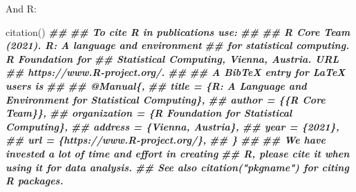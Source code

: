 \documentclass[
  ignorenonframetext,
  aspectratio=169,
]{beamer}
\newenvironment{Shaded}{\begin{snugshade}}{\end{snugshade}}
\newcommand{\DocumentationTok}[1]{\textcolor[rgb]{0.56,0.35,0.01}{\textbf{\textit{#1}}}}
\newcommand{\FunctionTok}[1]{\textcolor[rgb]{0.00,0.00,0.00}{#1}}
\newcommand{\NormalTok}[1]{#1}
\begin{document}
\begin{frame}[fragile]
And R:

\scriptsize

\begin{Shaded}
\begin{Highlighting}[]
\FunctionTok{citation}\NormalTok{()}
\DocumentationTok{\#\# }
\DocumentationTok{\#\# To cite R in publications use:}
\DocumentationTok{\#\# }
\DocumentationTok{\#\#   R Core Team (2021). R: A language and environment}
\DocumentationTok{\#\#   for statistical computing. R Foundation for}
\DocumentationTok{\#\#   Statistical Computing, Vienna, Austria. URL}
\DocumentationTok{\#\#   https://www.R{-}project.org/.}
\DocumentationTok{\#\# }
\DocumentationTok{\#\# A BibTeX entry for LaTeX users is}
\DocumentationTok{\#\# }
\DocumentationTok{\#\#   @Manual\{,}
\DocumentationTok{\#\#     title = \{R: A Language and Environment for Statistical Computing\},}
\DocumentationTok{\#\#     author = \{\{R Core Team\}\},}
\DocumentationTok{\#\#     organization = \{R Foundation for Statistical Computing\},}
\DocumentationTok{\#\#     address = \{Vienna, Austria\},}
\DocumentationTok{\#\#     year = \{2021\},}
\DocumentationTok{\#\#     url = \{https://www.R{-}project.org/\},}
\DocumentationTok{\#\#   \}}
\DocumentationTok{\#\# }
\DocumentationTok{\#\# We have invested a lot of time and effort in creating}
\DocumentationTok{\#\# R, please cite it when using it for data analysis.}
\DocumentationTok{\#\# See also \textquotesingle{}citation("pkgname")\textquotesingle{} for citing R packages.}
\end{Highlighting}
\end{Shaded}

\normalsize
\end{frame}
\end{document}
